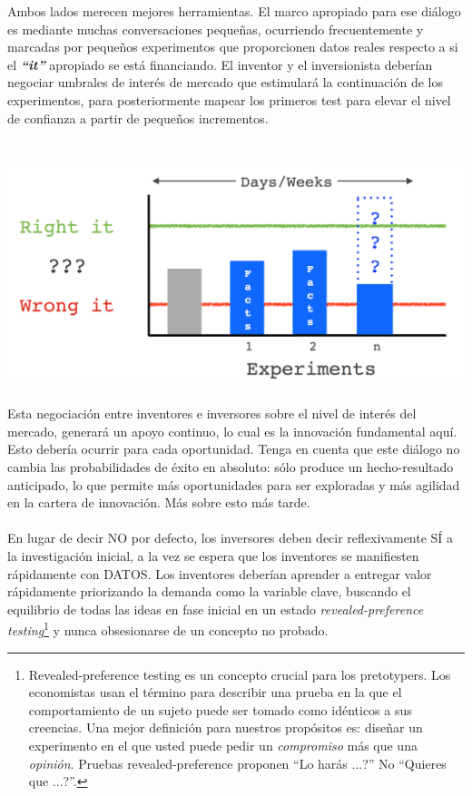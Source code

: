 \documentclass{article}
\begin{document}
Ambos lados merecen mejores herramientas. El marco apropiado para ese di\'alogo es mediante muchas conversaciones peque\~nas, ocurriendo frecuentemente y marcadas por peque\~nos experimentos que proporcionen datos reales respecto a si el \textbf{\textit{``it''}} apropiado se est\'a financiando. El inventor y el inversionista deber\'ian negociar umbrales de inter\'es de mercado que estimular\'a la continuaci\'on de los experimentos, para posteriormente mapear los primeros test para elevar el nivel de confianza a partir de peque\~nos incrementos.
\\ \\ \\
    \includegraphics[width=1.0\textwidth]{experiments}
\\ \\
Esta negociaci\'on entre inventores e inversores sobre el nivel de inter\'es del mercado, generar\'a un apoyo continuo, lo cual es la innovaci\'on fundamental aqu\'i. Esto deber\'ia ocurrir para cada oportunidad. Tenga en cuenta que este di\'alogo no cambia las probabilidades de \'exito en absoluto: s\'olo produce un hecho-resultado anticipado, lo que permite m\'as oportunidades para ser exploradas y m\'as agilidad en la cartera de innovaci\'on. M\'as sobre esto m\'as tarde.
\\ \\
En lugar de decir NO por defecto, los inversores deben decir reflexivamente S\'I a la investigaci\'on inicial, a la vez se espera que los inventores se manifiesten r\'apidamente con DATOS. Los inventores deber\'ian aprender a entregar valor r\'apidamente priorizando la demanda como la variable clave, buscando el equilibrio de todas las ideas en fase inicial en un estado \textit{revealed-preference testing}\footnote{Revealed-preference testing es un concepto crucial para los pretotypers. Los economistas usan el t\'ermino para describir una prueba en la que el comportamiento de un sujeto puede ser tomado como id\'enticos a sus creencias. Una mejor definici\'on para nuestros prop\'ositos es: dise\~nar un experimento en el que usted puede pedir un \textit{compromiso} m\'as que una \textit{opini\'on}. Pruebas revealed-preference proponen ``Lo har\'as ...?'' No ``Quieres que ...?''.} y nunca obsesionarse de un concepto no probado.
\end{document}
